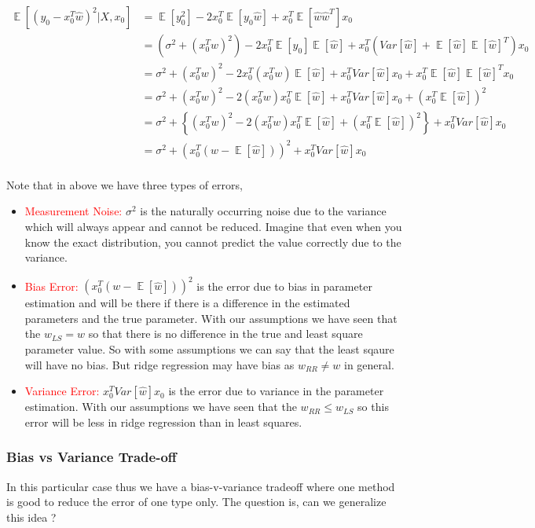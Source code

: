 \documentclass{article}
\DeclareMathOperator*{\E}{\mathop{\mathbb{E}}}
\newcommand{\red}[1]{\textcolor{red}{#1}}
\begin{document}
\begin{align*}
    \E[(y_0-x_0^T\hat{w})^2 \vert X, x_0] &= \E[y_0^2] - 2x_0^T\E[y_0\hat{w}] + x_0^T\E[\hat{w}\hat{w}^T]x_0\\
    &= (\sigma^2 + (x_0^Tw)^2) - 2x_0^T\E[y_0]\E[\hat{w}] + x_0^T (Var[\hat{w}] + \E[\hat{w}]\E[\hat{w}]^T) x_0\\
    &= \sigma^2 + (x_0^Tw)^2 - 2x_0^T (x_0^Tw) \E[\hat{w}] + x_0^T Var[\hat{w}]x_0 + x_0^T \E[\hat{w}]\E[\hat{w}]^T x_0\\
    &= \sigma^2 + (x_0^Tw)^2 - 2(x_0^Tw) x_0^T \E[\hat{w}] + x_0^T Var[\hat{w}]x_0 + (x_0^T \E[\hat{w}])^2\\
    &= \sigma^2 + \left\{ (x_0^Tw)^2 - 2(x_0^Tw) x_0^T \E[\hat{w}] + (x_0^T \E[\hat{w}])^2 \right\} + x_0^T Var[\hat{w}]x_0\\
    &= \sigma^2 + (x_0^T (w - \E[\hat{w}]))^2 + x_0^T Var[\hat{w}]x_0\\   
\end{align*}

Note that in above we have three types of errors,
\begin{itemize}
    \item \red{Measurement Noise:} $\sigma^2$ is the naturally occurring noise due to the variance which will always appear and cannot be reduced. Imagine that even when you know the exact distribution, you cannot predict the value correctly due to the variance.
    \item \red{Bias Error:} $(x_0^T (w - \E[\hat{w}]))^2$ is the error due to bias in parameter estimation and will be there if there is a difference in the estimated parameters and the true parameter. With our assumptions we have seen that the $w_{LS}=w$ so that there is no difference in the true and least square parameter value. So with some assumptions we can say that the least sqaure will have no bias. But ridge regression may have bias as $w_{RR} \neq w$ in general.
    \item \red{Variance Error:} $x_0^T Var[\hat{w}]x_0$ is the error due to variance in the parameter estimation. With our assumptions we have seen that the $w_{RR} \leq w_{LS}$ so this error will be less in ridge regression than in least squares.
\end{itemize}

\subsubsection{Bias vs Variance Trade-off}
In this particular case thus we have a bias-v-variance tradeoff where one method is good to reduce the error of one type only. The question is, can we generalize this idea ?
\end{document}
